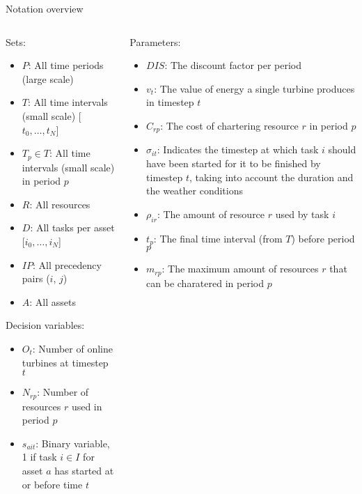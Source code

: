 \documentclass{beamer}
\begin{document}
\begin{frame}{Notation overview}
\scriptsize

\begin{columns}
\begin{column}{.48\textwidth}
Sets:
\begin{itemize}
\item $P$: All time periods (large scale)
\item $T$: All time intervals (small scale) [$t_0, \dots , t_N$]
\item $T_p \in T$: All time intervals (small scale) in period $p$
\item $R$: All resources
\item $D$:  All tasks per asset [$i_0, \dots , i_N$]
\item $IP$: All precedency pairs ($i$, $j$)
\item $A$: All assets
\end{itemize}

Decision variables:
\begin{itemize}
\item $O_{t}$: Number of online turbines at timestep $t$
\item $N_{rp}$: Number of resources $r$ used in period $p$
\item $s_{ait}$: Binary variable, 1 if task $i \in I$ for asset $a$ has started at or before time $t$
\end{itemize}
\end{column}

\hfill

\begin{column}{.48\textwidth}
Parameters:
\begin{itemize}
\item $DIS$: The discount factor per period
\item $v_t$: The value of energy a single turbine produces in timestep $t$
\item $C_{rp}$: The cost of chartering resource $r$ in period $p$
\item $\sigma_{it}$: Indicates the timestep at which task $i$ should have been started for it to be finished by timestep $t$, taking into account the duration and the weather conditions
\item $\rho_{ir}$: The amount of resource $r$ used by task $i$
\item $t_p$: The final time interval (from $T$) before period $p$
\item $m_{rp}$: The maximum amount of resources $r$ that can be charatered in period $p$
\end{itemize}
\end{column}
\end{columns}

\end{frame}
\end{document}
